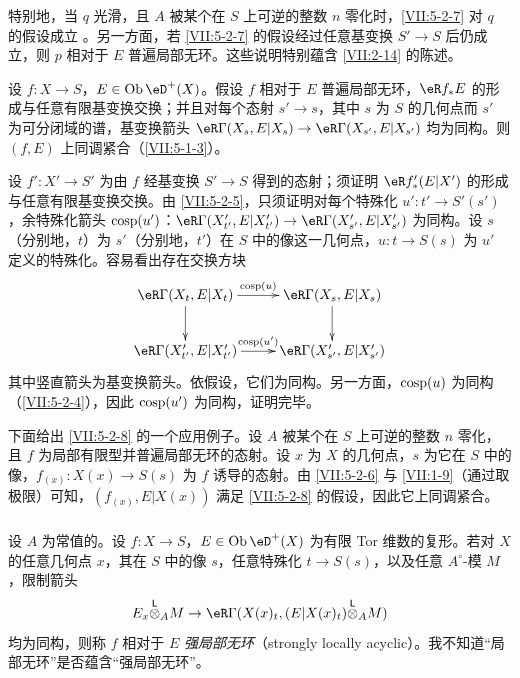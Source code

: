 特别地，当 $q$ 光滑，且 $A$ 被某个在 $S$ 上可逆的整数 $n$ 零化时，\ref{VII:5-2-7} 对 $q$ 的假设成立 \cite[XV]{sga4}。另一方面，若 \ref{VII:5-2-7} 的假设经过任意基变换 $S'\to S$ 后仍成立，则 $p$ 相对于 $E$ 普遍局部无环。这些说明特别蕴含 \ref{VII:2-14} 的陈述。

\begin{corollary}\label{VII:5-2-8}
设 $f:X\to S$，$E\in \ob\eD^+(X)$。假设 $f$ 相对于 $E$ 普遍局部无环，$\eR f_\ast E$ 的形成与任意有限基变换交换；并且对每个态射 $s'\to s$，其中 $s$ 为 $S$ 的几何点而 $s'$ 为可分闭域的谱，基变换箭头 $\eR\Gamma(X_s,E|X_s)\to \eR\Gamma(X_{s'},E|X_{s'})$ 均为同构。则 $(f,E)$ 上同调紧合（\ref{VII:5-1-3}）。
\end{corollary}

设 $f':X'\to S'$ 为由 $f$ 经基变换 $S'\to S$ 得到的态射；须证明 $\eR f'_\ast(E|X')$ 的形成与任意有限基变换交换。由 \ref{VII:5-2-5}，只须证明对每个特殊化 $u':t'\to S'(s')$，余特殊化箭头 $\operatorname{cosp}(u')$：$\eR\Gamma(X_{t'}',E|X_{t'}') \to \eR\Gamma(X_{s'}',E|X_{s'}')$ 为同构。设 $s$（分别地，$t$）为 $s'$（分别地，$t'$）在 $S$ 中的像这一几何点，$u:t\to S(s)$ 为 $u'$ 定义的特殊化。容易看出存在交换方块
\[\xymatrix{
  \eR\Gamma(X_t,E|X_t) \ar[r]^-{\cosp(u)} \ar[d]
    & \eR\Gamma(X_s,E|X_s) \ar[d] \\
  \eR\Gamma(X_{t'}',E|X_{t'}') \ar[r]^-{\cosp(u')}
    & \eR\Gamma(X_{s'}',E|X_{s'}')
}\]
其中竖直箭头为基变换箭头。依假设，它们为同构。另一方面，$\operatorname{cosp}(u)$ 为同构（\ref{VII:5-2-4}），因此 $\operatorname{cosp}(u')$ 为同构，证明完毕。

下面给出 \ref{VII:5-2-8} 的一个应用例子。设 $A$ 被某个在 $S$ 上可逆的整数 $n$ 零化，且 $f$ 为局部有限型并普遍局部无环的态射。设 $x$ 为 $X$ 的几何点，$s$ 为它在 $S$ 中的像，$f_{(x)}:X(x)\to S(s)$ 为 $f$ 诱导的态射。由 \ref{VII:5-2-6} 与 \ref{VII:1-9}（通过取极限）可知，$(f_{(x)},E|X(x))$ 满足 \ref{VII:5-2-8} 的假设，因此它上同调紧合。

\subsubsection{}\label{VII:5-2-9}

设 $A$ 为常值的。设 $f:X\to S$，$E\in\ob\eD^+(X)$ 为有限 Tor 维数的复形。若对 $X$ 的任意几何点 $x$，其在 $S$ 中的像 $s$，任意特殊化 $t\to S(s)$，以及任意 $A^\circ$-模 $M$，限制箭头
\[
  E_x\lotimes_A M \to \eR\Gamma(X(x)_t,(E|X(x)_t)\lotimes_A M)
\]
均为同构，则称 $f$ 相对于 $E$ \emph{强局部无环}（strongly locally acyclic）。我不知道“局部无环”是否蕴含“强局部无环”。

